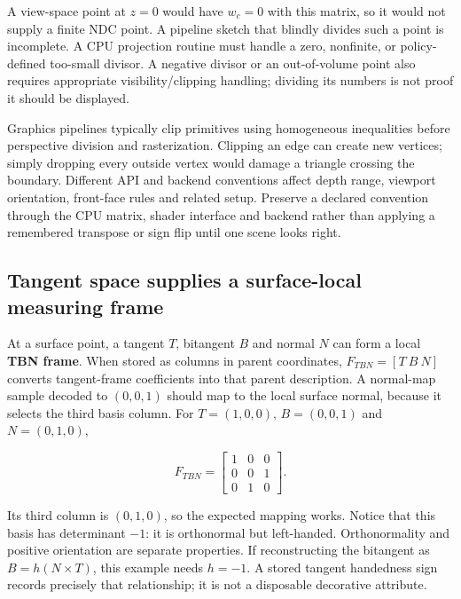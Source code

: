 A view-space point at \(z=0\) would have \(w_c=0\) with this matrix, so it would not supply a finite NDC point. A pipeline sketch that blindly divides such a point is incomplete. A CPU projection routine must handle a zero, nonfinite, or policy-defined too-small divisor. A negative divisor or an out-of-volume point also requires appropriate visibility/clipping handling; dividing its numbers is not proof it should be displayed.

Graphics pipelines typically clip primitives using homogeneous inequalities before perspective division and rasterization. Clipping an edge can create new vertices; simply dropping every outside vertex would damage a triangle crossing the boundary. Different API and backend conventions affect depth range, viewport orientation, front-face rules and related setup. Preserve a declared convention through the CPU matrix, shader interface and backend rather than applying a remembered transpose or sign flip until one scene looks right.

\subsection{Tangent space supplies a surface-local measuring frame}\label{01-foundations-i-ch019-tangent-space-supplies-a-surface-local-measuring-frame}

\hypertarget{01-foundations-i-ch019-tangent-space-supplies-a-surface-local-measuring-frame}{}

At a surface point, a tangent \(T\), bitangent \(B\) and normal \(N\) can form a local \textbf{TBN frame}. When stored as columns in parent coordinates, \(F_{TBN}=[T\ B\ N]\) converts tangent-frame coefficients into that parent description. A normal-map sample decoded to \((0,0,1)\) should map to the local surface normal, because it selects the third basis column. For \(T=(1,0,0)\), \(B=(0,0,1)\) and \(N=(0,1,0)\),

\[
F_{TBN}=\begin{bmatrix}1&0&0\\0&0&1\\0&1&0\end{bmatrix}.
\]

Its third column is \((0,1,0)\), so the expected mapping works. Notice that this basis has determinant \(-1\): it is orthonormal but left-handed. Orthonormality and positive orientation are separate properties. If reconstructing the bitangent as \(B=h(N\times T)\), this example needs \(h=-1\). A stored tangent handedness sign records precisely that relationship; it is not a disposable decorative attribute.

